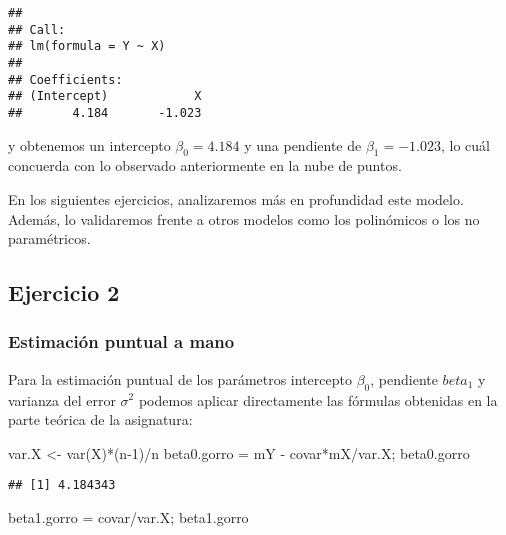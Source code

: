 \documentclass[
]{article}
\newenvironment{Shaded}{\begin{snugshade}}{\end{snugshade}}
\newcommand{\DecValTok}[1]{\textcolor[rgb]{0.00,0.00,0.81}{#1}}
\newcommand{\FunctionTok}[1]{\textcolor[rgb]{0.00,0.00,0.00}{#1}}
\newcommand{\NormalTok}[1]{#1}
\newcommand{\OtherTok}[1]{\textcolor[rgb]{0.56,0.35,0.01}{#1}}
\newcommand{\SpecialCharTok}[1]{\textcolor[rgb]{0.00,0.00,0.00}{#1}}
\begin{document}
\begin{verbatim}
## 
## Call:
## lm(formula = Y ~ X)
## 
## Coefficients:
## (Intercept)            X  
##       4.184       -1.023
\end{verbatim}

y obtenemos un intercepto \(\beta_0 = 4.184\) y una pendiente de
\(\beta_1 = -1.023\), lo cuál concuerda con lo observado anteriormente
en la nube de puntos.

En los siguientes ejercicios, analizaremos más en profundidad este
modelo. Además, lo validaremos frente a otros modelos como los
polinómicos o los no paramétricos.

\hypertarget{ejercicio-2}{%
\subsection{Ejercicio 2}\label{ejercicio-2}}

\hypertarget{estimaciuxf3n-puntual-a-mano}{%
\subsubsection{Estimación puntual a
mano}\label{estimaciuxf3n-puntual-a-mano}}

Para la estimación puntual de los parámetros intercepto \(\beta_0\),
pendiente \(beta_1\) y varianza del error \(\sigma^2\) podemos aplicar
directamente las fórmulas obtenidas en la parte teórica de la
asignatura:

\begin{Shaded}
\begin{Highlighting}[]
\NormalTok{var.X }\OtherTok{\textless{}{-}} \FunctionTok{var}\NormalTok{(X)}\SpecialCharTok{*}\NormalTok{(n}\DecValTok{{-}1}\NormalTok{)}\SpecialCharTok{/}\NormalTok{n}
\NormalTok{beta0.gorro }\OtherTok{=}\NormalTok{ mY }\SpecialCharTok{{-}}\NormalTok{ covar}\SpecialCharTok{*}\NormalTok{mX}\SpecialCharTok{/}\NormalTok{var.X; beta0.gorro}
\end{Highlighting}
\end{Shaded}

\begin{verbatim}
## [1] 4.184343
\end{verbatim}

\begin{Shaded}
\begin{Highlighting}[]
\NormalTok{beta1.gorro }\OtherTok{=}\NormalTok{ covar}\SpecialCharTok{/}\NormalTok{var.X; beta1.gorro}
\end{Highlighting}
\end{Shaded}
\end{document}

